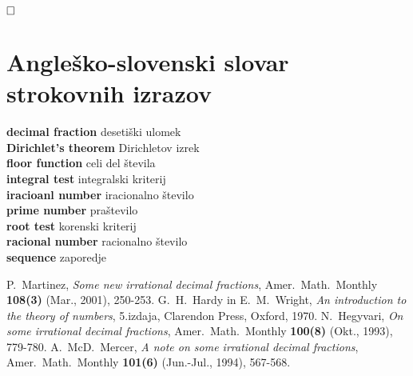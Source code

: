 \documentclass[a4paper,12pt]{article}
\newcommand{\geslo}[2]{\noindent\textbf{#1} \quad \hangindent=1cm #2\\[-1pc]}
\def\qed{$\hfill\Box$}   %
\begin{document}
\qed

\section*{Angleško-slovenski slovar strokovnih izrazov}

\geslo{decimal fraction}{desetiški ulomek}

\geslo{Dirichlet's theorem}{Dirichletov izrek}

\geslo{floor function}{celi del števila}

\geslo{integral test}{integralski kriterij}

\geslo{iracioanl number}{iracionalno število}

\geslo{prime number}{praštevilo}

\geslo{root test}{korenski kriterij}

\geslo{racional number}{racionalno število}

\geslo{sequence}{zaporedje}

\begin{thebibliography}{1}
    P.~Martinez, \emph{Some new irrational decimal fractions},
    Amer.~Math.~Monthly \textbf{108(3)}  (Mar., 2001),  250-253.
    G.~H.~Hardy in E.~M.~Wright, \emph{An introduction to the theory of numbers}, 
    5.izdaja, Clarendon Press, Oxford, 1970.
    N.~Hegyvari, \emph{On some irrational decimal fractions},
    Amer.~Math.~Monthly \textbf{100(8)}  (Okt., 1993),  779-780.
    A.~McD.~Mercer, \emph{A note on some irrational decimal fractions},
    Amer.~Math.~Monthly \textbf{101(6)}  (Jun.-Jul., 1994),  567-568.
    
\end{thebibliography}
\end{document}
